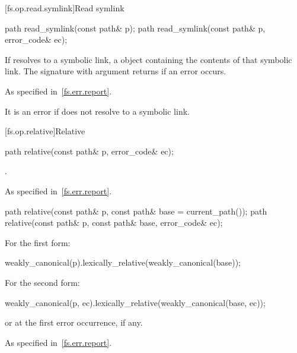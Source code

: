 [fs.op.read.symlink]{Read symlink}

%
\begin{itemdecl}
path read_symlink(const path& p);
path read_symlink(const path& p, error_code& ec);
\end{itemdecl}

\begin{itemdescr}
\pnum
\returns
If  resolves to a symbolic
  link, a  object containing the contents of that symbolic
  link. The signature with argument 
  returns  if an error occurs.

\pnum
\throws
As specified in~\ref{fs.err.report}.
\begin{note}
It is an error if  does not
  resolve to a symbolic link.
\end{note}
\end{itemdescr}

[fs.op.relative]{Relative}

%
\begin{itemdecl}
path relative(const path& p, error_code& ec);
\end{itemdecl}

\begin{itemdescr}
\pnum
\returns
{}.

\pnum
\throws
As specified in~\ref{fs.err.report}.
\end{itemdescr}

%
\begin{itemdecl}
path relative(const path& p, const path& base = current_path());
path relative(const path& p, const path& base, error_code& ec);
\end{itemdecl}

\begin{itemdescr}
\pnum
\returns
For the first form:
\begin{codeblock}
weakly_canonical(p).lexically_relative(weakly_canonical(base));
\end{codeblock}
  For the second form:
\begin{codeblock}
weakly_canonical(p, ec).lexically_relative(weakly_canonical(base, ec));
\end{codeblock}
  or  at the first error occurrence, if any.

\pnum
\throws
As specified in~\ref{fs.err.report}.
\end{itemdescr}

